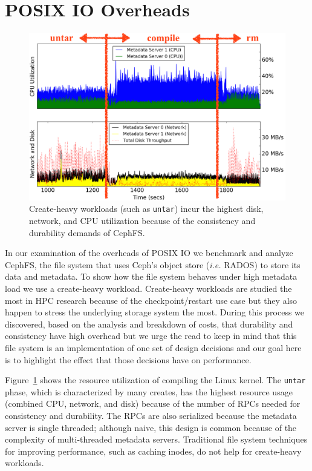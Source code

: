 \section{POSIX IO Overheads}
\label{sec:posix-overheads}

\begin{figure}[tb]
\centering
\includegraphics[width=1\linewidth]{./graphs/overhead-creates.png}
\caption{Create-heavy workloads (such as \texttt{untar}) incur the highest disk, network, and
CPU utilization because of the consistency and durability demands of
CephFS.}\label{fig:overhead-creates}
\end{figure}

In our examination of the overheads of POSIX IO we benchmark and analyze CephFS,
the file system that uses Ceph's object store ({\it i.e.} RADOS) to store its
data and metadata. To show how the file system behaves under high metadata load
we use a create-heavy workload. Create-heavy workloads are studied the most in
HPC research because of the checkpoint/restart use case but they also happen to
stress the underlying storage system the most.  During this process we
discovered, based on the analysis and breakdown of costs, that durability and
consistency have high overhead but we urge the read to keep in mind that this
file system is an implementation of one set of design decisions and our goal
here is to highlight the effect that those decisions have on performance.

Figure~\ref{fig:overhead-creates} shows the resource utilization of compiling
the Linux kernel.  The \texttt{untar} phase, which is characterized by many
creates, has the highest resource usage (combined CPU, network, and disk)
because of the number of RPCs needed for consistency and durability. The RPCs are
also serialized because the metadata server is single threaded; although naive,
this design is common because of the complexity of multi-threaded metadata
servers.  Traditional file system techniques for improving performance, such as
caching inodes, do not help for create-heavy workloads.

